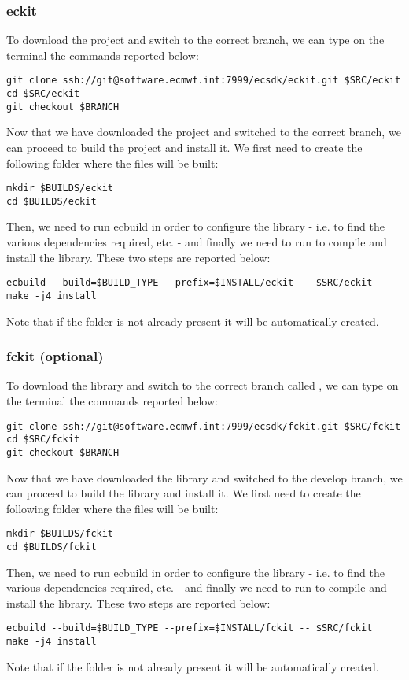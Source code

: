\subsubsection{eckit}
To download the project and switch to the correct branch,
we can type on the terminal the commands reported below:
%
\begin{lstlisting}[style=BashStyle]
git clone ssh://git@software.ecmwf.int:7999/ecsdk/eckit.git $SRC/eckit
cd $SRC/eckit
git checkout $BRANCH
\end{lstlisting}
%
Now that we have downloaded the project and switched 
to the correct branch, we can proceed to build the 
project and install it. We first need to create the 
following folder where the files will be built:
%
\begin{lstlisting}[style=BashStyle]
mkdir $BUILDS/eckit
cd $BUILDS/eckit
\end{lstlisting}
%
Then, we need to run ecbuild in order to configure the 
library - i.e. to find the various dependencies required, 
etc. - and finally we need to run  
to compile and install the library. These two steps are 
reported below:
%
\begin{lstlisting}[style=BashStyle]
ecbuild --build=$BUILD_TYPE --prefix=$INSTALL/eckit -- $SRC/eckit
make -j4 install
\end{lstlisting}
%
Note that if the folder  
is not already present it will be automatically created.

\subsubsection{fckit (optional)}
To download the library and switch to the correct branch called 
, we can type on the terminal the commands reported 
below:
%
\begin{lstlisting}[style=BashStyle]
git clone ssh://git@software.ecmwf.int:7999/ecsdk/fckit.git $SRC/fckit
cd $SRC/fckit
git checkout $BRANCH
\end{lstlisting}
%
Now that we have downloaded the library and switched 
to the develop branch, we can proceed to build the 
library and install it. We first need to create the 
following folder where the files will be built:
%
\begin{lstlisting}[style=BashStyle]
mkdir $BUILDS/fckit
cd $BUILDS/fckit
\end{lstlisting}
%
Then, we need to run ecbuild in order to configure the 
library - i.e. to find the various dependencies required, 
etc. - and finally we need to run  
to compile and install the library. These two steps are 
reported below:
%
\begin{lstlisting}[style=BashStyle]
ecbuild --build=$BUILD_TYPE --prefix=$INSTALL/fckit -- $SRC/fckit
make -j4 install
\end{lstlisting}
%
Note that if the folder  
is not already present it will be automatically created.



